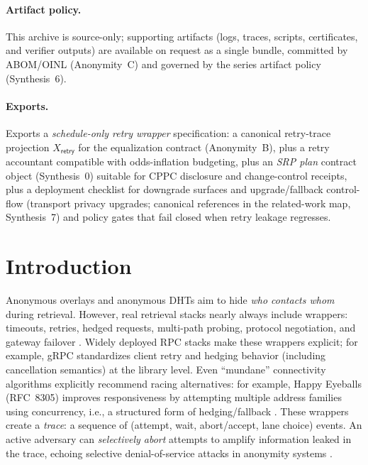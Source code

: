 \documentclass[11pt]{article}
\begin{document}
\paragraph{Artifact policy.} This archive is source-only; supporting artifacts (logs, traces, scripts, certificates, and verifier outputs) are available on request as a single bundle, committed by ABOM/OINL (Anonymity~C) and governed by the series artifact policy (Synthesis~6).\cite{series:artifactpolicy}

\paragraph{Exports.}
Exports a \emph{schedule-only retry wrapper} specification: a canonical retry-trace projection $X_{\mathsf{retry}}$ for the equalization contract (Anonymity~B),\cite{series:profiling}
plus a retry accountant compatible with odds-inflation budgeting,
plus an \emph{SRP plan} contract object (Synthesis~0) suitable for CPPC disclosure and change-control receipts,\cite{series:contractobjects}
plus a deployment checklist for downgrade surfaces and upgrade/fallback control-flow (transport privacy upgrades; canonical references in the related-work map, Synthesis~7)\cite{series:relatedworkmap} and policy gates that fail closed when retry leakage regresses.



\section{Introduction}
Anonymous overlays and anonymous DHTs aim to hide \emph{who contacts whom} during retrieval.
However, real retrieval stacks nearly always include wrappers:
timeouts, retries, hedged requests, multi-path probing, protocol negotiation, and gateway failover \cite{deanBarrosoTailAtScale2013,primoracWhenToHedgeNSDI2021}.
Widely deployed RPC stacks make these wrappers explicit; for example, gRPC standardizes client retry and hedging behavior (including cancellation semantics) at the library level.\cite{grpcClientRetriesA6}
Even ``mundane'' connectivity algorithms explicitly recommend racing alternatives: for example, Happy Eyeballs (RFC~8305) improves responsiveness by attempting multiple address families using concurrency, i.e., a structured form of hedging/fallback \cite{rfc8305HappyEyeballs}.
These wrappers create a \emph{trace}: a sequence of (attempt, wait, abort/accept, lane choice) events.
An active adversary can \emph{selectively abort} attempts to amplify information leaked in the trace, echoing selective denial-of-service attacks in anonymity systems \cite{borisovDanezisMittalCCS2007,dasborisovSelectiveDoS2013,jansenPointBreak2019}.
\end{document}
